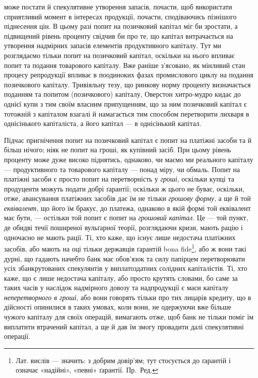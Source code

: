 \parcont{}  %
може постати й спекулятивне утворення запасів, почасти, щоб використати сприятливий
момент в інтересах продукції, почасти, сподіваючись пізнішого піднесення
цін. В цьому разі попит на позичковий капітал міг би зростати, а підвищений
рівень проценту свідчив би про те, що капітал витрачається на утворення
надмірних запасів елементів продуктивного капіталу. Тут ми розглядаємо
тільки попит на позичковий капітал, оскільки на нього впливає попит та
подання товарового капіталу. Вже раніше з’ясовано, як мінливий стан процесу
репродукції впливає в поодиноких фазах промислового циклу на подання позичкового
капіталу. Тривіяльну тезу, що ринкову норму проценту визначається
поданням та попитом (позичкового) капіталу, Оверстон хитро-мудро кидає до
однієї купи з тим своїм власним припущенням, що за ним позичковий капітал
є тотожній з капіталом взагалі й намагається тим способом перетворити лихваря
в однісінького капіталіста, а його капітал — в однісінький капітал.

Підчас пригнічення попит на позичковий капітал є попит на платіжні засоби
та й більш нічого; ніяк не попит на гроші, як купівний засіб. При цьому
рівень проценту може дуже високо піднятись, однаково, чи маємо ми реального
капіталу — продуктивного та товарового капіталу — понад міру, чи обмаль.
Попит на платіжні засоби є просто попит на перетворність у \emph{гроші}, оскільки
купці та продуценти можуть подати добрі ґарантії; оскільки ж цього не буває,
оскільки, отже, авансування платіжних засобів дає їм не тільки \emph{грошову}
\emph{форму}, а ще й той \emph{еквівалент}, що його їм бракує, до платежа, однаково в якій
формі той еквівалент має бути, — остільки той попит є попит на \emph{грошовий капітал}.
Це — той пункт, де обидві течії поширеної вульґарної теорії, розглядаючи
кризи, мають рацію і одночасно не мають рації. Ті, хто каже, що існує лише недостача
платіжних засобів, або мають на оці тільки державців ґарантій bona
fide\footnote{
Лат. вислів — значить: з добрим довір’ям; тут стосується до ґарантій і означає
«надійні», «певні» ґарантії. Пр.~Ред.
}, або ж вони такі дурні, що гадають начебто банк має обов’язок та силу
папірцем перетворювати усіх збанкрутованих спекулянтів у виплатоздатних солідних
капіталістів. Ті, хто каже, що є лише недостача капіталу, або просто
крутять словами, бо саме за таких часів у наслідок надмірного довозу та надпродукції
є маси капіталу \emph{неперетворного в гроші}, або вони говорять тільки
про тих лицарів кредиту, що в дійсності опинилися в таких умовах, коли вони,
не одержуючи вже більше чужого капіталу для своїх операцій, вимагають
отже, щоб банк не тільки поміг їм виплатити втрачений капітал, а ще й дав
їм змогу провадити далі спекулятивні операції.

